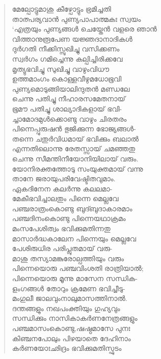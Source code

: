 \begin{verse}
മേല്പോട്ടുമാശു കീഴ്പോട്ടും ഭ്രമിച്ചതി\\
താത്പര്യവാന്‍ പുണ്യപാപാത്മകഃ സ്വയം\\
‘എത്രയും പുണ്യങ്ങള്‍ ചെയ്തേന്‍ വളരെ ഞാന്‍\\
വിത്താനുരൂപേണ യജ്ഞദാനാദികള്‍\\
ദുര്‍ഗതി നീക്കിസ്സുഖിച്ചു വസിക്കണം\\
സ്വര്‍ഗം ഗമിച്ചെന്നു കല്പിച്ചിരിക്കവേ\\
മൃത്യുഭവിച്ചു സുഖിച്ചു വാഴുംവിധൗ\\
ഉത്തമാംഗം കൊള്ളവീഴുമധോഭൂവി\\
പുണ്യമൊടുങ്ങിയാലിന്ദുതന്‍ മണ്ഡലേ\\
ചെന്നു പതിച്ചു നീഹാരസമേതനായ്\\
ഭൂമൗ പതിച്ചു ശാല്യാദികളായ് ഭവി-\\
ച്ചാമോദമുള്‍ക്കൊണ്ടു വാഴും ചിരതരം\\
പിന്നെപ്പുരുഷന്‍ ഭുജിക്കുന്ന ഭോജ്യങ്ങള്‍-\\
തന്നെ ചതുര്‍വിധമായ് ഭവിക്കും ബലാല്‍\\
എന്നതിലൊന്നു രേതസ്സായ് ചമഞ്ഞതു\\
ചെന്നു സീമന്തിനീയോനിയിലായ് വരും.\\
യോനിരക്തത്തോടു സംയുക്തമായ് വന്നു\\
താനേ ജരായുപരിവേഷ്ടിതവുമാം.\\
ഏകദിനേന കലര്‍ന്നു കലലമാ-\\
മേകീഭവിച്ചാലതും പിന്നെ മെല്ലവേ\\
പഞ്ചരാത്രംകൊണ്ടു ബുദ്ബുദാകാരമാം\\
പഞ്ചദിനംകൊണ്ടു പിന്നെയഥാക്രമം\\
മംസപേശിത്വം ഭവിക്കുമതിന്നതു\\
മാസാര്‍ദ്ധകാലേന പിന്നെയും മെല്ലവേ\\
പേശിരുധിര പരിപ്ലുതമായ് വരു-\\
മാശു തസ്യാമങ്കുരോല്പത്തിയും വരും\\
പിന്നെയൊരു പഞ്ചവിംശതി രാത്രിയാല്‍;\\
പിന്നെയൊരു മൂന്നു മാസേന സന്ധിക-\\
ളംഗങ്ങള്‍ തോറും ക്രമേണ ഭവിച്ചീടു-\\
മംഗുലീ ജാലവുംനാലുമാസത്തിനാല്‍.\\
ദന്തങ്ങളും നഖപംക്തിയും ഗുഹ്യവും\\
സന്ധിക്കും നാസികാകര്‍ണനേത്രങ്ങളും\\
പഞ്ചമാസംകൊണ്ടു,ഷഷ്ഠമാസേ പുനഃ\\
കിഞ്ചനപോലും പിഴയാതെ ദേഹിനാം\\
കര്‍ണയോഃഛിദ്രം ഭവിക്കുമതിസ്ഫുടം\\

\end{verse}
